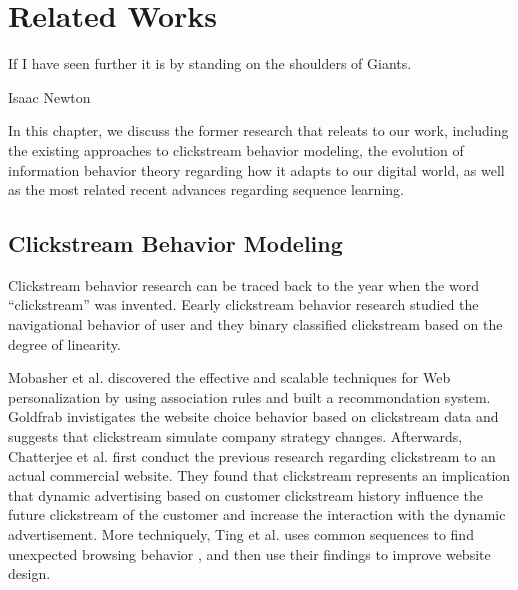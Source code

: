 \section{Related Works}
\label{ch:relate}
\epigraph{If I have seen further it is by standing on the shoulders of Giants.}{Isaac Newton}


In this chapter, we discuss the former research that releats to our work, including
the existing approaches to clickstream behavior modeling, the evolution of information 
behavior theory regarding how it adapts to our digital world, as well as the 
most related recent advances regarding sequence learning.

\subsection{Clickstream Behavior Modeling}

Clickstream behavior research can be traced back to the year when the word ``clickstream''
was invented. Eearly clickstream behavior research studied the navigational behavior
of user \cite{mandese1995clickstreams, brodwin1995} and 
they binary classified clickstream based on the degree of linearity.

Mobasher et al. discovered the effective and scalable techniques \cite{Mobasher:2001:EPB:502932.502935} for Web personalization
by using association rules and built a recommondation system. Goldfrab invistigates \cite{goldfarb2002analyzing} 
the website choice behavior based on clickstream data and suggests that clickstream simulate company strategy changes.
Afterwards, 
Chatterjee et al. \cite{chatterjee2003modeling} first conduct 
the previous research regarding clickstream to an actual commercial website.
They found that clickstream represents an implication that dynamic advertising
based on customer clickstream history influence the future clickstream of the customer
and increase the interaction with the dynamic advertisement.
More techniquely, Ting et al. uses common sequences to find unexpected browsing behavior \cite{Ting:2005:UMF:1092358.1092469},
and then use their findings to improve website design. 

